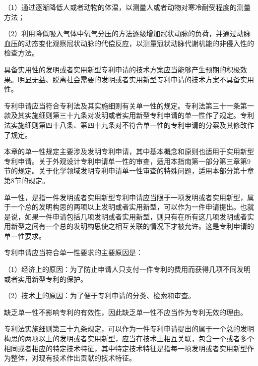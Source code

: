 {\setlength{\parindent}{17.1bp}（1）通过逐渐降低人或者动物的体温，以测量人或者动物对寒冷耐受程度的测量方法；\par}

{\setlength{\parindent}{17.1bp}（2）利用降低吸入气体中氧气分压的方法逐级增加冠状动脉的负荷，并通过动脉血压的动态变化观察冠状动脉的代偿反应，以测量冠状动脉代谢机能的非侵入性的检查方法。\par}

具备实用性的发明或者实用新型专利申请的技术方案应当能够产生预期的积极效果。明显无益、脱离社会需要的发明或者实用新型专利申请的技术方案不具备实用性。

专利申请应当符合专利法及其实施细则有关单一性的规定。专利法第三十一条第一款及其实施细则第三十九条对发明或者实用新型专利申请的单一性作了规定。专利法实施细则第四十八条、第四十九条对不符合单一性的专利申请的分案及其修改作了规定。

本章的单一性规定主要涉及发明专利申请，其中基本概念和原则也适用于实用新型专利申请。关于外观设计专利申请单一性的审查，适用本指南第一部分第三章第9节的规定。关于化学领域发明专利申请单一性审查的特殊问题，适用本部分第十章第8节的规定。

单一性，是指一件发明或者实用新型专利申请应当限于一项发明或者实用新型，属于一个总的发明构思的两项以上发明或者实用新型，可以作为一件申请提出。也就是说，如果一件申请包括几项发明或者实用新型，则只有在所有这几项发明或者实用新型之间有一个总的发明构思使之相互关联的情况下才被允许。这是专利申请的单一性要求。

专利申请应当符合单一性要求的主要原因是：

{\setlength{\parindent}{17.1bp}（1）经济上的原因：为了防止申请人只支付一件专利的费用而获得几项不同发明或者实用新型专利的保护。\par}

{\setlength{\parindent}{17.1bp}（2）技术上的原因：为了便于专利申请的分类、检索和审查。\par}

缺乏单一性不影响专利的有效性，因此缺乏单一性不应当作为专利无效的理由。

专利法实施细则第三十九条规定，可以作为一件专利申请提出的属于一个总的发明构思的两项以上的发明或者实用新型，应当在技术上相互关联，包含一个或者多个相同或者相应的特定技术特征，其中特定技术特征是指每一项发明或者实用新型作为整体，对现有技术作出贡献的技术特征。

